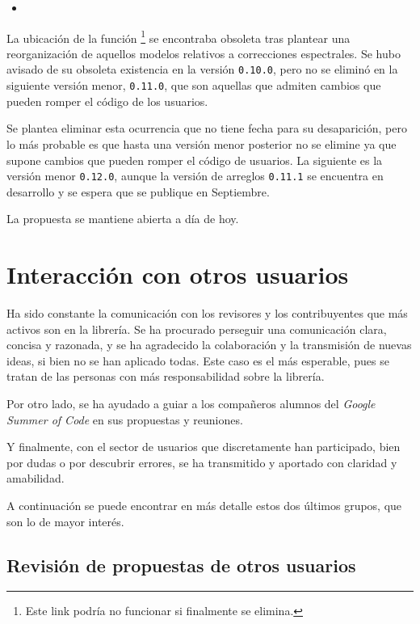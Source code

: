 \begin{itemize}
    \item {}
\end{itemize}

La ubicación de la función \footnote{Este link podría no funcionar si finalmente se elimina.} se encontraba obsoleta tras plantear una reorganización de aquellos modelos relativos a correcciones espectrales. Se hubo avisado de su obsoleta existencia en la versión \texttt{0.10.0}, pero no se eliminó en la siguiente versión menor, \texttt{0.11.0}, que son aquellas que admiten cambios que pueden romper el código de los usuarios.

Se plantea eliminar esta ocurrencia que no tiene fecha para su desaparición, pero lo más probable es que hasta una versión menor posterior no se elimine ya que supone cambios que pueden romper el código de usuarios. La siguiente es la versión menor \texttt{0.12.0}, aunque la versión de arreglos \texttt{0.11.1} se encuentra en desarrollo y se espera que se publique en Septiembre.

La propuesta se mantiene abierta a día de hoy.



\section{Interacción con otros usuarios}

Ha sido constante la comunicación con los revisores y los contribuyentes que más activos son en la librería. Se ha procurado perseguir una comunicación clara, concisa y razonada, y se ha agradecido la colaboración y la transmisión de nuevas ideas, si bien no se han aplicado todas. Este caso es el más esperable, pues se tratan de las personas con más responsabilidad sobre la librería.

Por otro lado, se ha ayudado a guiar a los compañeros alumnos del \textit{Google Summer of Code} en sus propuestas y reuniones.

Y finalmente, con el sector de usuarios que discretamente han participado, bien por dudas o por descubrir errores, se ha transmitido y aportado con claridad y amabilidad.

A continuación se puede encontrar en más detalle estos dos últimos grupos, que son lo de mayor interés.

\subsection{Revisión de propuestas de otros usuarios}

